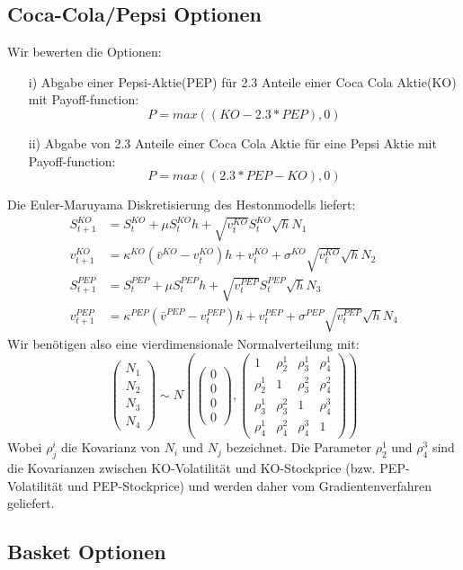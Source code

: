 \documentclass[a4paper,12pt]{article}
\numberwithin[\arabic]{Satz}{section}
\begin{document}
	\subsection*{Coca-Cola/Pepsi Optionen}
		Wir bewerten die Optionen: 
		\begin{itemize}
			\item[i)] Abgabe einer Pepsi-Aktie(PEP) für 2.3 Anteile einer Coca Cola Aktie(KO) mit Payoff-function:
				\begin{equation*}
				P=max((KO-2.3*PEP),0)
				\end{equation*}			
			\item[ii)] Abgabe von 2.3 Anteile einer Coca Cola Aktie für eine Pepsi Aktie mit Payoff-function:
			\begin{equation*}
			P=max((2.3*PEP-KO),0)
			\end{equation*}			
		\end{itemize}
		Die Euler-Maruyama Diskretisierung des Hestonmodells liefert:
		\begin{align*}
		S^{KO}_{t+1}&=S^{KO}_{t}+\mu S^{KO}_{t}h+\sqrt{v^{KO}_t}S^{KO}_{t}\sqrt{h}N_1\\
		v^{KO}_{t+1}&=\kappa^{KO}(\bar{v}^{KO}-v^{KO}_t)h+v^{KO}_t+\sigma^{KO}\sqrt{v^{KO}_t}\sqrt{h}N_2\\
		S^{PEP}_{t+1}&=S^{PEP}_{t}+\mu S^{PEP}_{t}h+\sqrt{v^{PEP}_t}S^{PEP}_{t}\sqrt{h}N_3\\
		v^{PEP}_{t+1}&=\kappa^{PEP}(\bar{v}^{PEP}-v^{PEP}_t)h+v^{PEP}_t+\sigma^{PEP}\sqrt{v^{PEP}_t}\sqrt{h}N_4
		\end{align*}
		Wir benötigen also eine vierdimensionale Normalverteilung mit:
		\begin{equation*}
		\left({\begin{array}{c} N_1\\ N_2\\ N_3\\ N_4\end{array}}\right) \sim N\left(\left({\begin{array}{c} 0 \\ 0 \\ 0 \\ 0 \end{array}}\right),\left({\begin{array}{cccc} 1 & \rho^1_2 & \rho^1_3 & \rho^1_4\\ \rho^1_2 & 1 & \rho^2_3 & \rho^2_4 \\ \rho^1_3 & \rho^2_3 & 1 & \rho^3_4 \\ \rho^1_4 & \rho^2_4 & \rho^3_4 & 1 \end{array}}\right)\right)
		\end{equation*}
		Wobei $\rho^{i}_j$ die Kovarianz von $N_i$ und $N_j$ bezeichnet.
		Die Parameter $\rho^1_2$ und $\rho^3_4$ sind die Kovarianzen zwischen KO-Volatilität und KO-Stockprice (bzw. PEP-Volatilität und PEP-Stockprice) und werden daher vom Gradientenverfahren geliefert. 
	\subsection*{Basket Optionen}		
\end{document}
